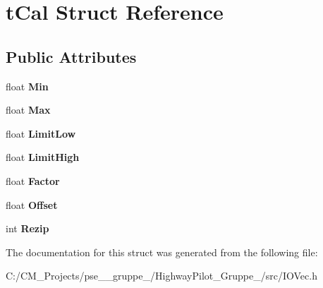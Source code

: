\hypertarget{structt_cal}{}\section{t\+Cal Struct Reference}
\label{structt_cal}
\subsection*{Public Attributes}
\begin{DoxyCompactItemize}
\item 
\mbox{\label{structt_cal_a79f088eb8b9d818346013996ce2bd023}} 
float {\bfseries Min}
\item 
\mbox{\label{structt_cal_af60af64b5f008a5769ed3c1d4bca42dc}} 
float {\bfseries Max}
\item 
\mbox{\label{structt_cal_ae30831bb3a19b525bad2a5d9e8444611}} 
float {\bfseries Limit\+Low}
\item 
\mbox{\label{structt_cal_a610138930a0bccb068a2a3343ea6c919}} 
float {\bfseries Limit\+High}
\item 
\mbox{\label{structt_cal_a7e6afdae2a9f5b7ca1bffb608ab9345a}} 
float {\bfseries Factor}
\item 
\mbox{\label{structt_cal_abbe3300cabe1547a794c59dc90851fad}} 
float {\bfseries Offset}
\item 
\mbox{\label{structt_cal_af884b30cf010eb754b90e6d8781a7bc5}} 
int {\bfseries Rezip}
\end{DoxyCompactItemize}


The documentation for this struct was generated from the following file\+:\begin{DoxyCompactItemize}
\item 
C\+:/\+C\+M\+\_\+\+Projects/pse\+\_\+\_\+gruppe\+\_/\+Highway\+Pilot\+\_\+\+Gruppe\+\_/src/I\+O\+Vec.\+h\end{DoxyCompactItemize}
